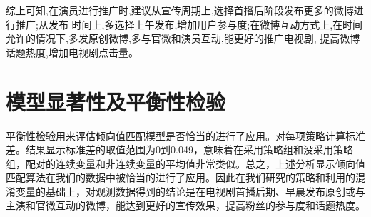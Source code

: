 综上可知,在演员进行推广时,建议从宣传周期上,选择首播后阶段发布更多的微博进行推广;从发布 时间上,多选择上午发布,增加用户参与度;在微博互动方式上,在时间允许的情况下,多发原创微博,多与官微和演员互动,能更好的推广电视剧, 提高微博话题热度,增加电视剧点击量。

\section{模型显著性及平衡性检验}
平衡性检验用来评估倾向值匹配模型是否恰当的进行了应用。对每项策略计算标准差。结果显示标准差的取值范围为0到0.049，意味着在采用策略组和没采用策略组，配对的连续变量和非连续变量的平均值非常类似。总之，上述分析显示倾向值匹配算法在我们的数据中被恰当的进行了应用。因此在我们研究的策略和利用的混淆变量的基础上，对观测数据得到的结论是在电视剧首播后期、早晨发布原创或与主演和官微互动的微博，能达到更好的宣传效果，提高粉丝的参与度和话题热度。







